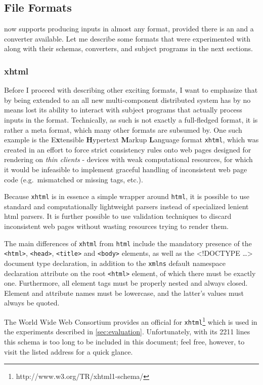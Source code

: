 \subsection{File Formats}
\label{sec:formats}
\xmlmate now supports producing inputs in almost any format, provided there is an \xsd and a converter
available. Let me describe some formats that were experimented with along with their schemas, converters, and
subject programs in the next sections.
\tocless\subsubsection{xhtml}
Before I proceed with describing other exciting formats, I want to emphasize that by being extended to an all
new multi-component distributed system \xmlmate has by no means lost its ability to interact with subject
programs that actually process inputs in the \xml format. Technically, \xml as such is not exactly a
full-fledged format, it is rather a meta format, which many other formats are subsumed by. One
such example is the E\textbf{x}tensible \textbf{H}ypertext \textbf{M}arkup \textbf{L}anguage format
\texttt{xhtml}, which was created in an effort to force strict consistency rules onto web pages designed for
rendering on \emph{thin clients} - devices with weak computational resources, for which it would be infeasible
to implement graceful handling of inconsistent web page code (e.g.\ mismatched or missing tags, etc.). 
 
Because \texttt{xhtml} is in essence a simple \xml wrapper around \texttt{html}, it is possible to use standard
and computationally lightweight \xml parsers instead of specialized lenient html parsers. It is further
possible to use \xml validation techniques to discard inconsistent web pages without wasting resources trying
to render them.

The main differences of \texttt{xhtml} from \texttt{html} include the mandatory presence of the
\texttt{<html>}, \texttt{<head>}, \texttt{<title>} and \texttt{<body>} elements, as well as the {\small
<!DOCTYPE \ldots>} document type declaration, in addition to the \texttt{xmlns} default namespace declaration
attribute on the root \texttt{<html>} element, of which there must be exactly one. Furthermore, all element
tags must be properly nested and always closed. Element and attribute names must be lowercase, and the
latter's values must always be quoted.

The World Wide Web Consortium provides an official \xsd for
\texttt{xhtml}\footnote{http://www.w3.org/TR/xhtml1-schema/} which is used in the \xmlmate experiments
described in \cref{sec:evaluation}. Unfortunately, with its 2211 lines this schema is too long to be included
in this document; feel free, however, to visit the listed address for a quick glance.

